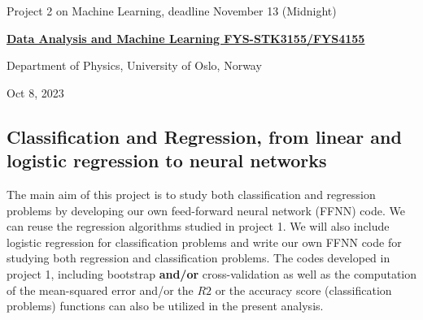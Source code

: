 \documentclass[%
oneside,                 %
final,                   %
10pt]{article}
\begin{document}

\newcommand{\exercisesection}[1]{\subsection*{#1}}






\thispagestyle{empty}

\begin{center}
{\LARGE\bf
\begin{spacing}{1.25}
Project 2 on Machine Learning, deadline November 13 (Midnight)
\end{spacing}
}
\end{center}


\begin{center}
{\bf \href{{http://www.uio.no/studier/emner/matnat/fys/FYS3155/index-eng.html}}{Data Analysis and Machine Learning FYS-STK3155/FYS4155}}
\end{center}

    \begin{center}
\centerline{{\small Department of Physics, University of Oslo, Norway}}
\end{center}
    

\begin{center}
Oct 8, 2023
\end{center}

\vspace{1cm}


\subsection*{Classification and Regression, from linear and logistic regression to neural networks}

The main aim of this project is to study both classification and
regression problems by developing our own feed-forward neural network
(FFNN) code. We can reuse the regression algorithms studied in project
1. We will also include logistic regression for classification
problems and write our own FFNN code for studying both regression and
classification problems.  The codes developed in project 1, including
bootstrap \textbf{and/or} cross-validation as well as the computation of the
mean-squared error and/or the $R2$ or the accuracy score
(classification problems) functions can also be utilized in the
present analysis.
\end{document}
